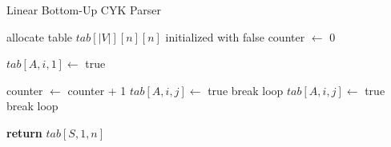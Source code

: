 \begin{algorithm}[H]
    \caption{Linear Bottom-Up CYK Parser}
    \label{alg:bu_linear}
    \begin{algorithmic}[1]
        \State allocate table $tab[|V|][n][n]$ initialized with false
        \State counter $\leftarrow$ 0
    
                \State $tab[A,i,1] \leftarrow$ true
            \EndFor
        \EndFor

                    \State counter $\leftarrow$ counter + 1
                            \State $tab[A,i,j]\leftarrow$ true
                            \State break loop
                        \EndIf
                    \Else
                            \State $tab[A,i,j]\leftarrow$ true
                            \State break loop
                        \EndIf
                    \EndIf
                \EndFor
            \EndFor
        \EndFor

        \State \textbf{return} $tab[S,1,n]$
        \EndFunction
    \end{algorithmic}
\end{algorithm}


